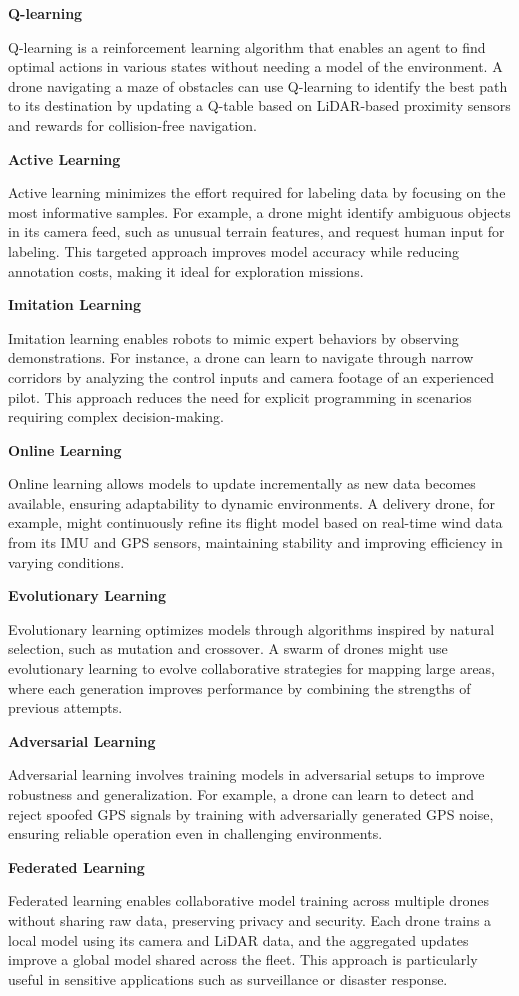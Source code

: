 \documentclass{book}
\providecommand{\ProjectDeepHeading}[2]{%
    \par\medskip\noindent\textbf{#2}\par\smallskip
}
\begin{document}
\ProjectDeepHeading{5}{Q-learning}
Q-learning is a reinforcement learning algorithm that enables an agent to find optimal actions in various states without needing a model of the environment. A drone navigating a maze of obstacles can use Q-learning to identify the best path to its destination by updating a Q-table based on LiDAR-based proximity sensors and rewards for collision-free navigation.

\ProjectDeepHeading{4}{Active Learning}
Active learning minimizes the effort required for labeling data by focusing on the most informative samples. For example, a drone might identify ambiguous objects in its camera feed, such as unusual terrain features, and request human input for labeling. This targeted approach improves model accuracy while reducing annotation costs, making it ideal for exploration missions.

\ProjectDeepHeading{4}{Imitation Learning}
Imitation learning enables robots to mimic expert behaviors by observing demonstrations. For instance, a drone can learn to navigate through narrow corridors by analyzing the control inputs and camera footage of an experienced pilot. This approach reduces the need for explicit programming in scenarios requiring complex decision-making. 

\ProjectDeepHeading{4}{Online Learning}
Online learning allows models to update incrementally as new data becomes available, ensuring adaptability to dynamic environments. A delivery drone, for example, might continuously refine its flight model based on real-time wind data from its IMU and GPS sensors, maintaining stability and improving efficiency in varying conditions. 

\ProjectDeepHeading{4}{Evolutionary Learning}
Evolutionary learning optimizes models through algorithms inspired by natural selection, such as mutation and crossover. A swarm of drones might use evolutionary learning to evolve collaborative strategies for mapping large areas, where each generation improves performance by combining the strengths of previous attempts. 

\ProjectDeepHeading{4}{Adversarial Learning}
Adversarial learning involves training models in adversarial setups to improve robustness and generalization. For example, a drone can learn to detect and reject spoofed GPS signals by training with adversarially generated GPS noise, ensuring reliable operation even in challenging environments. 

\ProjectDeepHeading{4}{Federated Learning}
Federated learning enables collaborative model training across multiple drones without sharing raw data, preserving privacy and security. Each drone trains a local model using its camera and LiDAR data, and the aggregated updates improve a global model shared across the fleet. This approach is particularly useful in sensitive applications such as surveillance or disaster response. 
\end{document}
